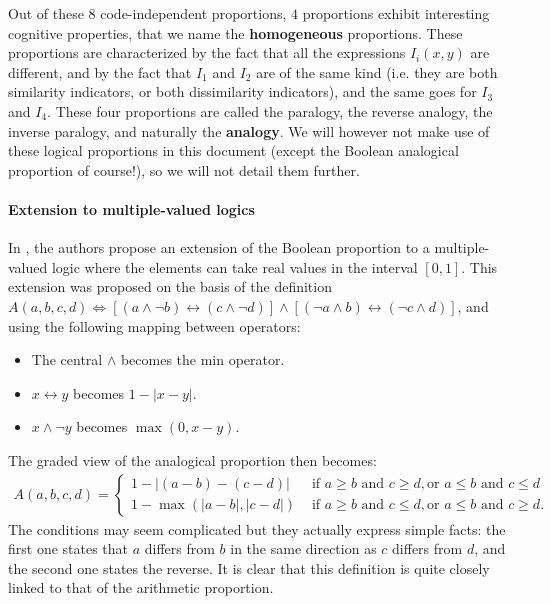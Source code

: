 Out of these $8$ code-independent proportions, $4$ proportions exhibit
interesting cognitive properties, that we name the \textbf{homogeneous}
proportions. These proportions are characterized by the fact that all the
expressions $I_i(x, y)$ are different, and by the fact that $I_1$ and $I_2$ are
of the same kind (i.e. they are both similarity indicators, or both
dissimilarity indicators), and the same goes for $I_3$ and $I_4$. These four
proportions are called the paralogy, the reverse analogy, the inverse paralogy,
and naturally the \textbf{analogy}. We will however not make use of these
logical proportions in this document (except the Boolean analogical proportion of
course!), so we will not detail them further.

\paragraph{Extension to multiple-valued logics\\}

In \cite{PraRic13}, the authors propose an extension of the Boolean proportion
to a multiple-valued logic where the elements can take real values in the
interval $[0, 1]$.  This extension was proposed on the basis of the definition
$A(a, b, c, d) \iff \left[(a \wedge \neg b) \leftrightarrow (c \wedge \neg
d)\right]  \wedge \left[(\neg a \wedge b)\leftrightarrow (\neg c \wedge
d)\right]$, and using the following mapping between operators:
\begin{itemize}
  \item The central $\wedge$ becomes the min operator.
  \item $x \leftrightarrow y$ becomes $1 - |x - y|$.
  \item $x \wedge \neg y$ becomes $\max(0, x-y)$.
\end{itemize}
The graded view of the analogical proportion then becomes:
\begin{align*}
A(a, b, c, d) =
\begin{cases}
  1 - |(a - b) - (c - d)| &\text{ if } a \geq b \text { and } c \geq d, \text{
    or } a \leq b \text{ and } c \leq d\\
  1 - \max(|a - b|, |c - d|) &\text{ if } a \geq b \text { and } c \leq d, \text{
    or } a \leq b \text{ and } c \geq d.
\end{cases}
\end{align*}
The conditions may seem complicated but they actually express simple facts: the
first one states that $a$ differs from $b$ in the same direction as $c$ differs
from $d$, and the second one states the reverse. It is clear that this
definition is quite closely linked to that of the arithmetic proportion.


